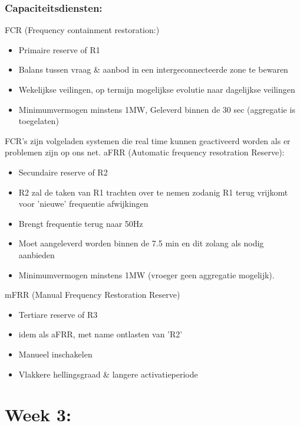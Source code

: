\documentclass[12pt]{article}
\begin{document}
\subsubsection{Capaciteitsdiensten:}
FCR (Frequency containment restoration:)\begin{itemize}
    \item Primaire reserve of R1
    \item Balans tussen vraag \& aanbod in een intergeconnecteerde zone te bewaren 
    \item Wekelijkse veilingen, op termijn mogelijkse evolutie naar dagelijkse veilingen 
    \item Minimumvermogen minstens 1MW, Geleverd binnen de 30 sec (aggregatie is toegelaten)
\end{itemize}
FCR's zijn volgeladen systemen die real time kunnen geactiveerd worden als er problemen zijn op ons net.\newline
aFRR (Automatic frequency resotration Reserve):\begin{itemize}
    \item Secundaire reserve of R2 
    \item R2 zal de taken van R1 trachten over te nemen zodanig R1 terug vrijkomt voor 'nieuwe' frequentie afwijkingen 
    \item Brengt frequentie terug naar 50Hz
    \item Moet aangeleverd worden binnen de 7.5 min en dit zolang als nodig aanbieden
    \item Minimumvermogen minstens 1MW (vroeger geen aggregatie mogelijk).
\end{itemize}
mFRR (Manual Frequency Restoration Reserve)\begin{itemize}
    \item Tertiare reserve of R3 
    \item idem als aFRR, met name ontlasten van 'R2'
    \item Manueel inschakelen 
    \item Vlakkere hellingsgraad \& langere activatieperiode
\end{itemize}
\section{Week 3:}
\end{document}
